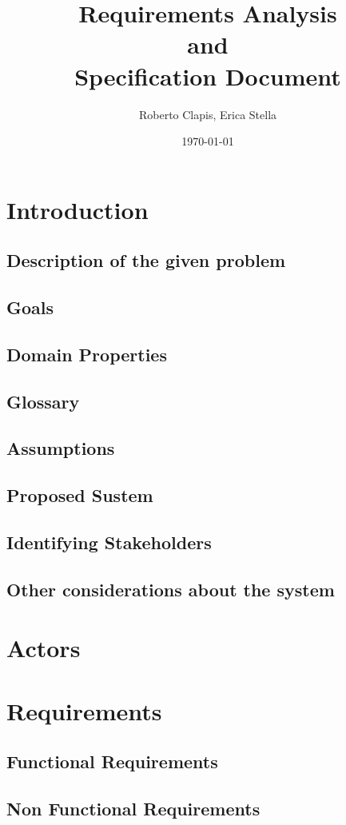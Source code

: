 \documentclass{article}
\author{Roberto Clapis, Erica Stella}
\date{\today}
\title{Requirements Analysis \\ and \\ Specification Document}
\begin{document}
\maketitle
\section{Introduction}
\subsection{Description of the given problem}
\subsection{Goals}
\subsection{Domain Properties}
\subsection{Glossary}
\subsection{Assumptions}
\subsection{Proposed Sustem}
\subsection{Identifying Stakeholders}
\subsection{Other considerations about the system}
\section{Actors}
\section{Requirements}
\subsection{Functional Requirements}
\subsection{Non Functional Requirements}
\end{document}
